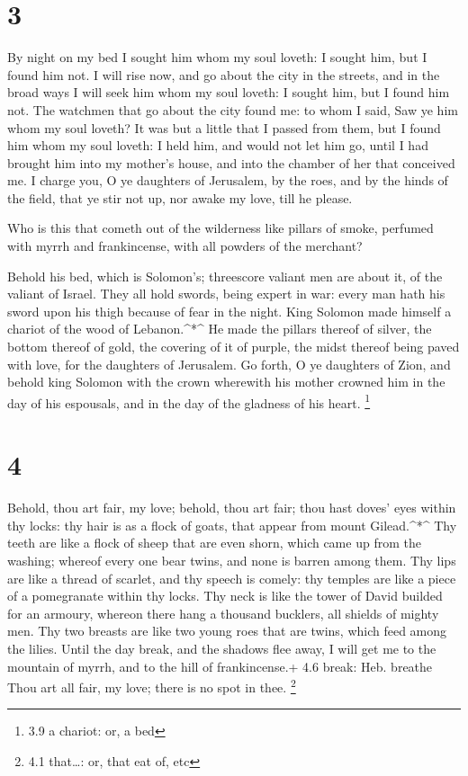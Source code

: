 \hypertarget{section-2}{%
\section{3}\label{section-2}}

 By night on my bed I sought him whom my soul loveth: I
sought him, but I found him not.  I will rise now, and go
about the city in the streets, and in the broad ways I will seek him
whom my soul loveth: I sought him, but I found him not.  The
watchmen that go about the city found me: to whom I said, Saw ye him
whom my soul loveth?  It was but a little that I passed from
them, but I found him whom my soul loveth: I held him, and would not let
him go, until I had brought him into my mother's house, and into the
chamber of her that conceived me.  I charge you, O ye
daughters of Jerusalem, by the roes, and by the hinds of the field, that
ye stir not up, nor awake my love, till he please.

 Who is this that cometh out of the wilderness like pillars
of smoke, perfumed with myrrh and frankincense, with all powders of the
merchant?

 Behold his bed, which is Solomon's; threescore valiant men
are about it, of the valiant of Israel.  They all hold
swords, being expert in war: every man hath his sword upon his thigh
because of fear in the night.  King Solomon made himself a
chariot of the wood of Lebanon.\^{}*\^{}  He made the
pillars thereof of silver, the bottom thereof of gold, the covering of
it of purple, the midst thereof being paved with love, for the daughters
of Jerusalem.  Go forth, O ye daughters of Zion, and behold
king Solomon with the crown wherewith his mother crowned him in the day
of his espousals, and in the day of the gladness of his heart.
\footnote{3.9 a chariot: or, a bed}

\hypertarget{section-3}{%
\section{4}\label{section-3}}

 Behold, thou art fair, my love; behold, thou art fair; thou
hast doves' eyes within thy locks: thy hair is as a flock of goats, that
appear from mount Gilead.\^{}*\^{}  Thy teeth are like a
flock of sheep that are even shorn, which came up from the washing;
whereof every one bear twins, and none is barren among them.
 Thy lips are like a thread of scarlet, and thy speech is
comely: thy temples are like a piece of a pomegranate within thy locks.
 Thy neck is like the tower of David builded for an armoury,
whereon there hang a thousand bucklers, all shields of mighty men.
 Thy two breasts are like two young roes that are twins,
which feed among the lilies.  Until the day break, and the
shadows flee away, I will get me to the mountain of myrrh, and to the
hill of frankincense.+ 4.6 break: Heb. breathe  Thou art all
fair, my love; there is no spot in thee. \footnote{4.1 that\ldots: or,
  that eat of, etc}

